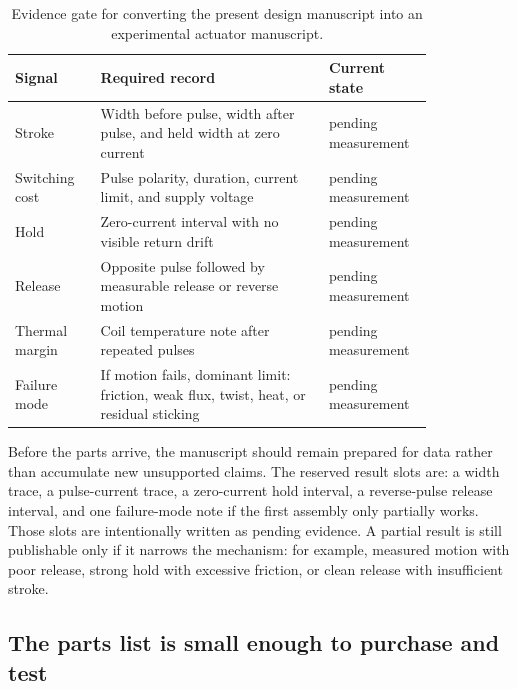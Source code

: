 \documentclass[12pt,letterpaper]{article}
\newcommand{\pending}{\textcolor{DustyTaupe}{pending measurement}}
\begin{document}
\begin{table}[tbp]
\centering
\begingroup
\footnotesize
\setlength{\tabcolsep}{5pt}
\caption{Evidence gate for converting the present design manuscript into an experimental actuator manuscript.}
\label{tab:evidence}
\begin{tabular}{@{}L{0.18\linewidth} L{0.48\linewidth} L{0.17\linewidth}@{}}
\toprule
Signal & Required record & Current state \\
\midrule
Stroke & Width before pulse, width after pulse, and held width at zero current & \pending \\
Switching cost & Pulse polarity, duration, current limit, and supply voltage & \pending \\
Hold & Zero-current interval with no visible return drift & \pending \\
Release & Opposite pulse followed by measurable release or reverse motion & \pending \\
Thermal margin & Coil temperature note after repeated pulses & \pending \\
Failure mode & If motion fails, dominant limit: friction, weak flux, twist, heat, or residual sticking & \pending \\
\bottomrule
\end{tabular}
\endgroup
\end{table}

Before the parts arrive, the manuscript should remain prepared for data rather than accumulate new unsupported claims. The reserved result slots are: a width trace, a pulse-current trace, a zero-current hold interval, a reverse-pulse release interval, and one failure-mode note if the first assembly only partially works. Those slots are intentionally written as pending evidence. A partial result is still publishable only if it narrows the mechanism: for example, measured motion with poor release, strong hold with excessive friction, or clean release with insufficient stroke.

\subsection{The parts list is small enough to purchase and test}
\end{document}
